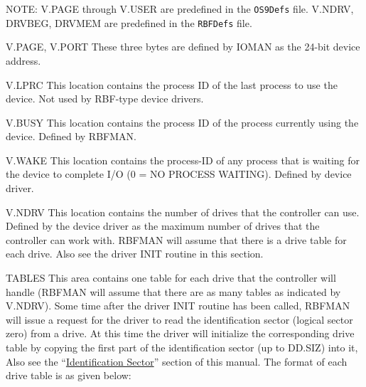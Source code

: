 \documentclass[
]{article}
\begin{document}
NOTE: V.PAGE through V.USER are predefined in the \texttt{OS9Defs} file.
V.NDRV, DRVBEG, DRVMEM are predefined in the \texttt{RBFDefs} file.

V.PAGE, V.PORT These three bytes are defined by IOMAN as the 24-bit
device address.

V.LPRC This location contains the process ID of the last process to use
the device. Not used by RBF-type device drivers.

V.BUSY This location contains the process ID of the process currently
using the device. Defined by RBFMAN.

V.WAKE This location contains the process-ID of any process that is
waiting for the device to complete I/O (0 = NO PROCESS WAITING). Defined
by device driver.

V.NDRV This location contains the number of drives that the controller
can use. Defined by the device driver as the maximum number of drives
that the controller can work with. RBFMAN will assume that there is a
drive table for each drive. Also see the driver INIT routine in this
section.

TABLES This area contains one table for each drive that the controller
will handle (RBFMAN will assume that there are as many tables as
indicated by V.NDRV). Some time after the driver INIT routine has been
called, RBFMAN will issue a request for the driver to read the
identification sector (logical sector zero) from a drive. At this time
the driver will initialize the corresponding drive table by copying the
first part of the identification sector (up to DD.SIZ) into it, Also see
the ``\hyperref[ident-sector]{Identification Sector}'' section of this
manual. The format of each drive table is as given below:
\end{document}
